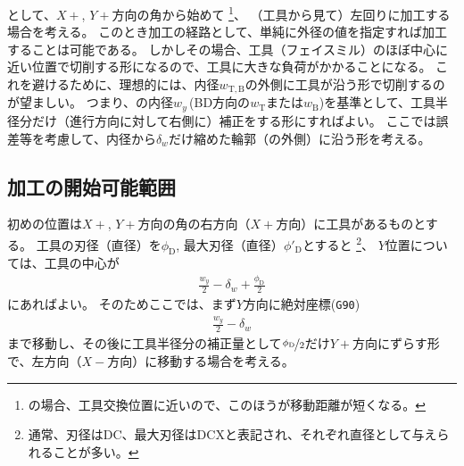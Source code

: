 


\clearpage
\EndFacecutMilling として、$X+$, $Y+$方向の角から始めて
\footnote{\DMC の場合、工具交換位置に近いので、このほうが移動距離が短くなる。}、
（工具から見て）左回りに加工する場合を考える。
このとき加工の経路として、単純に外径の値を指定すれば加工することは可能である。
しかしその場合、工具（フェイスミル）のほぼ中心に近い位置で切削する形になるので、工具に大きな負荷がかかることになる。
これを避けるために、理想的には、内径$w_{\mathrm T, \mathrm B}$の外側に工具が沿う形で切削するのが望ましい。
つまり、\EndFace の内径$w_y$\,(BD方向の$w_{\mathrm T}$または$w_{\mathrm B}$)を基準として、工具半径分だけ（進行方向に対して右側に）補正をする形にすればよい。
ここでは誤差等を考慮して、内径から$\delta_w$だけ縮めた輪郭（の外側）に沿う形を考える。


\subsection{加工の開始可能範囲}
初めの位置は$X+$, $Y+$方向の角の右方向（$X+$方向）に工具があるものとする。
工具の刃径（直径）を$\phi_\mathrm D$, 最大刃径（直径）$\phi'_\mathrm D$とすると
\footnote{通常、刃径はDC、最大刃径はDCXと表記され、それぞれ直径として与えられることが多い。}、
$Y$位置については、工具の中心が
\begin{align}
  \label{eq:tanmenKakouStartY}
  \frac{w_y}2-\delta_w+\frac{\phi_\mathrm D}2
\end{align}
にあればよい。
そのためここでは、まず$Y$方向に絶対座標(\verb|G90|)
\begin{align*}
  \frac{w_y}2-\delta_w
\end{align*}
まで移動し、その後に工具半径分の補正量として$\nicefrac{\phi_\mathrm D}2$だけ$Y+$方向にずらす形で、左方向（$X-$方向）に移動する場合を考える。


